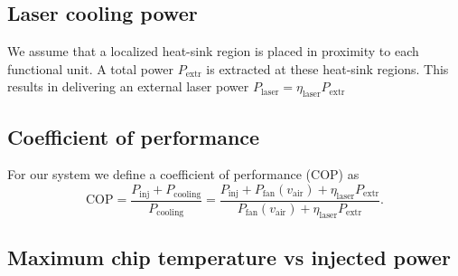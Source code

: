 \documentclass[11pt]{article}
\begin{document}
\subsection{Laser cooling power}

We assume that a localized heat-sink region is placed in proximity to each functional unit. A total power $P_\mathrm{extr}$ is extracted at these heat-sink regions. This results in delivering an external laser power $P_\mathrm{laser}=\eta_\mathrm{laser} P_\mathrm{extr}$

\subsection{Coefficient of performance}

For our system we define a coefficient of performance (COP) as
\begin{equation}
	\mathrm{COP} = \frac{P_\mathrm{inj} + P_\mathrm{cooling}}{P_\mathrm{cooling}} =  \frac{P_\mathrm{inj} + P_\mathrm{fan}(v_\mathrm{air}) + \eta_\mathrm{laser} P_\mathrm{extr}}{P_\mathrm{fan}(v_\mathrm{air}) + \eta_\mathrm{laser} P_\mathrm{extr}}.
\end{equation}

\subsection{Maximum chip temperature vs injected power}
\end{document}
